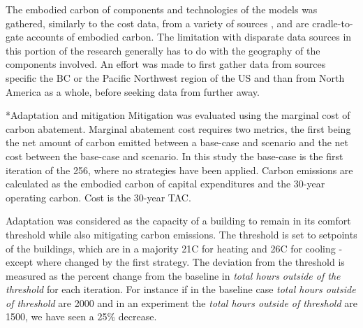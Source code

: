 \documentclass[twocolumn, a4paper,10pt]{article}
\makeatletter
\renewcommand\subsection{\@startsection{subsection}{1}{\z@}{\z@}{\z@}{\normalfont\normalsize\bfseries}}
\renewcommand\subsection{\@startsection{subsection}{1}{\z@}{\z@}{0.1pt}{\normalfont\normalsize\bfseries}}
\makeatother
\begin{document}
The embodied carbon of components and technologies of the models was gathered, similarly to the cost data, from a variety of sources \citep{jones_ice_2019, droguett_embodied_2019,rodriguez_embodied_2019,c-change_labs_embodied_2020}, and are cradle-to-gate accounts of embodied carbon. The limitation with disparate data sources in this portion of the research generally has to do with the geography of the components involved. An effort was made to first gather data from sources specific the BC or the Pacific Northwest region of the US and than from North America as a whole, before seeking data from further away. 

\subsection*{Adaptation and mitigation}
Mitigation was evaluated using the marginal cost of carbon abatement. Marginal abatement cost requires two metrics, the first being the net amount of carbon emitted between a base-case and scenario and the net cost between the base-case and scenario. In this study the base-case is the first iteration of the 256, where no strategies have been applied. Carbon emissions are calculated as the embodied carbon of capital expenditures and the 30-year operating carbon. Cost is the 30-year TAC.

Adaptation was considered as the capacity of a building to remain in its comfort threshold while also mitigating carbon emissions. The threshold is set to setpoints of the buildings, which are in a majority 21C for heating and 26C for cooling - except where changed by the first strategy. The deviation from the threshold is measured as the percent change from the baseline in \textit{total hours outside of the threshold} for each iteration. For instance if in the baseline case \textit{total hours outside of threshold} are 2000 and in an experiment the \textit{total hours outside of threshold} are 1500, we have seen a 25\% decrease. 

\end{document}
